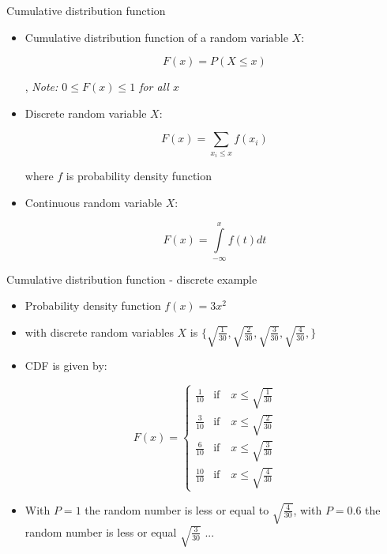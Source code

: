 \begin{slide}[toc=CDF]{Cumulative distribution function}
\null\vfill

  \begin{itemize}
    
    \item Cumulative distribution function of a random variable $X$:
    
    $$F(x) = P (X \leq x)$$
    
    \sep
    {\it\color{pdcolor3} Note: $0 \leq F(x) \leq 1$ for all $x$}
        
    \item Discrete random variable $X$:
    
    $$F (x) = \sum\limits_{x_i \leq x} f (x_i)$$

    where $f$ is probability density function
    
    \item Continuous random variable $X$:
    
    $$F (x) = \int\limits_{-\infty}^{x} f (t) dt$$ 
        
  \end{itemize}

\vfill\null
\end{slide}

\begin{slide}[toc=CDF discrete]{Cumulative distribution function - discrete example}
\null\vfill

  \begin{itemize}
    
    \item Probability density function $f(x) = 3x^2$
    \item[] with discrete random variables $X$ is $\{\sqrt{\frac{1}{30}}, \sqrt{\frac{2}{30}}, \sqrt{\frac{3}{30}}, \sqrt{\frac{4}{30}},\}$
    \item CDF is given by:
    
  \end{itemize}
  
  \twocolumn
  {
  $$F (x) = \begin{cases}
	      \frac{1}{10}  & \mbox{if~~~} x \leq \sqrt{\frac{1}{30}} \\
	      \frac{3}{10}  & \mbox{if~~~} x \leq \sqrt{\frac{2}{30}} \\
	      \frac{6}{10}  & \mbox{if~~~} x \leq \sqrt{\frac{3}{30}} \\
	      \frac{10}{10} & \mbox{if~~~} x \leq \sqrt{\frac{4}{30}} 
	    \end{cases}
  $$
  }
  {
    
  }
  \vspace{-10pt}
  \begin{itemize}
  
    \item With $P = 1$ the random number is less or equal to $\sqrt{\frac{4}{30}}$, with $P = 0.6$ the random number is less or equal $\sqrt{\frac{3}{30}}$ ...
    
  \end{itemize}

\vfill\null
\end{slide}

